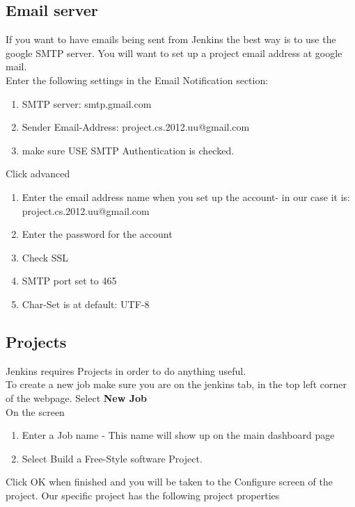 \subsection{Email server}

If you want to have emails being sent from Jenkins the best way is to use the google SMTP server. You will want to set up a project email address at google mail.\\

Enter the following settings in the Email Notification section:
\begin{enumerate}
\item SMTP server: smtp.gmail.com
\item Sender Email-Address: project.cs.2012.uu@gmail.com
\item make sure USE SMTP Authentication is checked.
\end{enumerate}

Click advanced 
\begin{enumerate}
\item Enter the email address name when you set up the account- in our case it is: project.cs.2012.uu@gmail.com
\item Enter the password for the account
\item Check SSL
\item SMTP port set to 465
\item Char-Set is at default: UTF-8
\end{enumerate}

\subsection{Projects}

Jenkins requires Projects in order to do anything useful. \\

To create a new job make sure you are on the jenkins tab, in the top left corner of the webpage. 
Select \textbf{New Job}\\

On the screen 
\begin{enumerate}
\item Enter a Job name - This name will show up on the main dashboard page
\item Select Build a Free-Style software Project.
\end{enumerate}
Click OK when finished and you will be taken to the Configure screen of the project.
Our specific project has the following project properties

